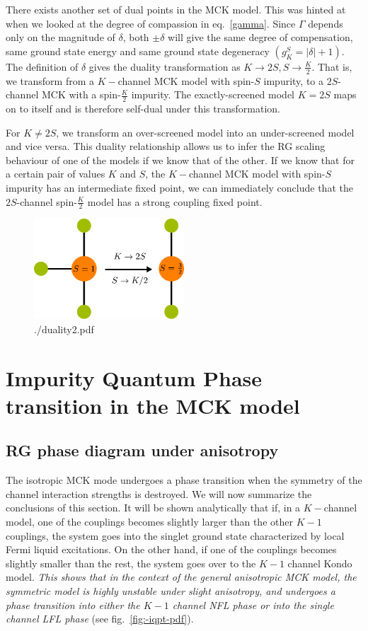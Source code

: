 \documentclass[reprint,prb,superscriptaddress]{revtex4-2}
\begin{document}
There exists another set of dual points in the MCK model. This was hinted at when we looked at the degree of compassion in eq.~\ref{gamma}. Since \(\Gamma\) depends only on the magnitude of \(\delta\), both \(\pm \delta\) will give the same degree of compensation, same ground state energy and same ground state degeneracy \(\left(g^S_K = |\delta|+1\right)\). The definition of \(\delta\) gives the duality transformation as \(K \to 2S, S \to \frac{K}{2}\). That is, we transform from a \(K-\)channel MCK model with spin-\(S\) impurity, to a \(2S\)-channel MCK with a spin-\(\frac{K}{2}\) impurity. The exactly-screened model \(K=2S\) maps on to itself and is therefore self-dual under this transformation.

For \(K \neq 2S\), we transform an over-screened model into an under-screened model and vice versa. This duality relationship allows us to infer the RG scaling behaviour of one of the models if we know that of the other. If we know that for a certain pair of values \(K\) and \(S\), the \(K-\)channel MCK model with spin-\(S\) impurity has an intermediate fixed point, we can immediately conclude that the \(2S\)-channel spin-\(\frac{K}{2}\) model has a strong coupling fixed point.
\begin{figure}[htpb]
	\centering
	\includegraphics[width=0.5\textwidth]{./duality2.pdf}
	\caption{./duality2.pdf}
	\label{fig:-duality2-pdf}
\end{figure}

\section{Impurity Quantum Phase transition in the MCK model}

\subsection{RG phase diagram under anisotropy}
\label{anisotropic_rg}
The isotropic MCK mode undergoes a phase transition when the symmetry of the channel interaction strengths is destroyed. We will now summarize the conclusions of this section. It will be shown analytically that if, in a \(K-\)channel model, one of the couplings becomes slightly larger than the other \(K-1\) couplings, the system goes into the singlet ground state characterized by local Fermi liquid excitations. On the other hand, if one of the couplings becomes slightly smaller than the rest, the system goes over to the \(K-1\) channel Kondo model. \textit{This shows that in the context of the general anisotropic MCK model, the symmetric model is highly unstable under slight anisotropy, and undergoes a phase transition into either the \(K-1\) channel NFL phase or into the single channel LFL phase} (see fig.~\ref{fig:-iqpt-pdf}).
\end{document}
